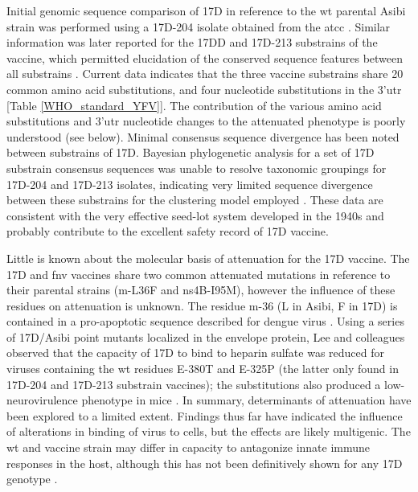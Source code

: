 Initial genomic sequence comparison of 17D in reference to the \gls{wt} parental Asibi strain was performed using a 17D-204 isolate obtained from the \gls{atcc} \parencite{Hahn:1987tw}. Similar information was later reported for the 17DD and 17D-213 substrains of the vaccine, which permitted elucidation of the conserved sequence features between all substrains \parencite{dosSantos:1995wq}. Current data indicates that the three vaccine substrains share 20 common amino acid substitutions, and four nucleotide substitutions in the 3’\gls{utr} [Table \ref{WHO_standard_YFV}]. The contribution of the various amino acid substitutions and 3’\gls{utr} nucleotide changes to the attenuated phenotype is poorly understood (see below). Minimal consensus sequence divergence has been noted between substrains of 17D. Bayesian phylogenetic analysis for a set of 17D substrain consensus sequences was unable to resolve taxonomic groupings for 17D-204 and 17D-213 isolates, indicating very limited sequence divergence between these substrains for the clustering model employed \parencite{Stock:2012gp}. These data are consistent with the very effective seed-lot system developed in the 1940s and probably contribute to the excellent safety record of 17D vaccine.

Little is known about the molecular basis of attenuation for the 17D vaccine. The 17D and \gls{fnv} vaccines share two common attenuated mutations in reference to their parental strains (\gls{m}-L36F and \gls{ns}4B-I95M), however the influence of these residues on attenuation is unknown. The residue \gls{m}-36 (L in Asibi, F in 17D) is contained in a pro-apoptotic sequence described for dengue virus \parencite{Catteau:2003dl}. Using a series of 17D/Asibi point mutants localized in the envelope protein, Lee and colleagues observed that the capacity of 17D to bind to heparin sulfate was reduced for viruses containing the \gls{wt} residues E-380T and E-325P (the latter only found in 17D-204 and 17D-213 substrain vaccines); the substitutions also produced a low-neurovirulence phenotype in mice \parencite{Lee:2008gd}. In summary, determinants of attenuation have been explored to a limited extent. Findings thus far have indicated the influence of alterations in binding of virus to cells, but the effects are likely multigenic. The \gls{wt} and vaccine strain may differ in capacity to antagonize innate immune responses in the host, although this has not been definitively shown for any 17D genotype \parencite{MunozJordan:2005ia}.

